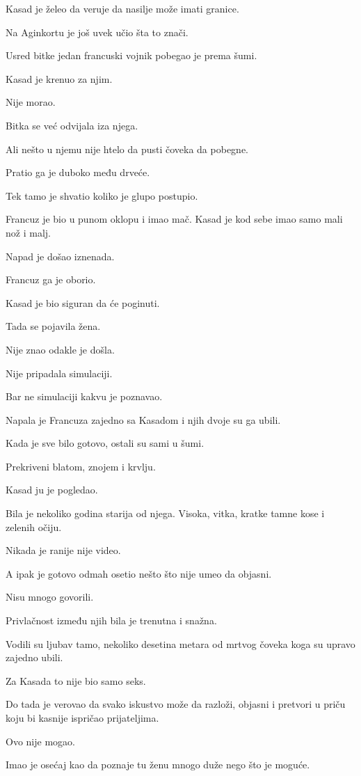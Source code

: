 Kasad je želeo da veruje da nasilje može imati granice.

Na Aginkortu je još uvek učio šta to znači.

Usred bitke jedan francuski vojnik pobegao je prema šumi.

Kasad je krenuo za njim.

Nije morao.

Bitka se već odvijala iza njega.

Ali nešto u njemu nije htelo da pusti čoveka da pobegne.

Pratio ga je duboko među drveće.

Tek tamo je shvatio koliko je glupo postupio.

Francuz je bio u punom oklopu i imao mač. Kasad je kod sebe imao samo mali nož i malj.

Napad je došao iznenada.

Francuz ga je oborio.

Kasad je bio siguran da će poginuti.

Tada se pojavila žena.

Nije znao odakle je došla.

Nije pripadala simulaciji.

Bar ne simulaciji kakvu je poznavao.

Napala je Francuza zajedno sa Kasadom i njih dvoje su ga ubili.

Kada je sve bilo gotovo, ostali su sami u šumi.

Prekriveni blatom, znojem i krvlju.

Kasad ju je pogledao.

Bila je nekoliko godina starija od njega. Visoka, vitka, kratke tamne kose i zelenih očiju.

Nikada je ranije nije video.

A ipak je gotovo odmah osetio nešto što nije umeo da objasni.

Nisu mnogo govorili.

Privlačnost između njih bila je trenutna i snažna.

Vodili su ljubav tamo, nekoliko desetina metara od mrtvog čoveka koga su upravo zajedno ubili.

Za Kasada to nije bio samo seks.

Do tada je verovao da svako iskustvo može da razloži, objasni i pretvori u priču koju bi kasnije ispričao prijateljima.

Ovo nije mogao.

Imao je osećaj kao da poznaje tu ženu mnogo duže nego što je moguće.

